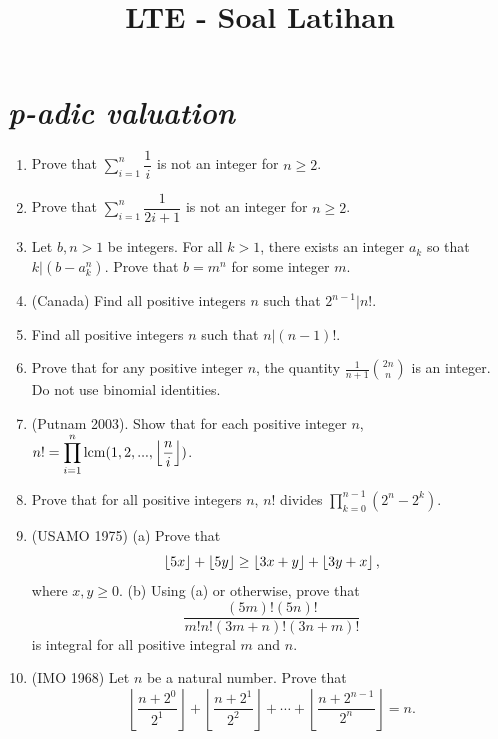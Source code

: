 \documentclass[12pt]{scrartcl}
\title{LTE - Soal Latihan}
\begin{document}
\maketitle

\renewcommand*\contentsname{Daftar Isi}
\tableofcontents

\newpage
\section{\textit{p-adic valuation}}
\begin{enumerate}
    \item Prove that $\displaystyle\sum_{i=1}^{n} \dfrac{1}{i}$ is not an integer for $n \geq 2$.
    
    \item Prove that $\displaystyle\sum_{i=1}^{n} \dfrac{1}{2i+1}$ is not an integer for $n \geq 2$.
    
    \item Let $b, n > 1$ be integers. For all $k > 1$, there exists an integer $a_k$ so that $k | (b-a_k^n)$. Prove that $b = m^n$ for some integer $m$.
    
    \item (Canada) Find all positive integers $n$ such that $2^{n-1}|n!$.
    
    \item Find all positive integers $n$ such that $n | (n-1)!$.
    
    \item Prove that for any positive integer $n$, the quantity $\frac{1}{n+1}\binom{2n}{n}$ is an integer. Do not use binomial identities.
    
    \item (Putnam 2003). Show that for each positive integer $n$, $n! = \displaystyle\prod_{i=1}^n \operatorname{lcm}(1,2,...,\left\lfloor \frac{n}{i} \right\rfloor)$.
    
    \item Prove that for all positive integers $n$, $n!$ divides $\displaystyle\prod_{k=0}^{n-1} (2^n-2^k)$.
    
    \item (USAMO 1975) (a) Prove that \[ \left\lfloor 5x \right\rfloor+\left\lfloor 5y \right\rfloor \ge \left\lfloor 3x+y \right\rfloor+\left\lfloor 3y+x \right\rfloor,\] where $ x,y \ge 0$.
    (b) Using (a) or otherwise, prove that \[ \frac{(5m)!(5n)!}{m!n!(3m+n)!(3n+m)!}\] is integral for all positive integral $ m$ and $ n$. 

    \item (IMO 1968) Let $n$ be a natural number. Prove that\[ \left\lfloor \frac{n+2^0}{2^1} \right\rfloor + \left\lfloor \frac{n+2^1}{2^2} \right\rfloor +\cdots +\left\lfloor \frac{n+2^{n-1}}{2^n}\right\rfloor =n. \]
    

\end{enumerate}
\end{document}
